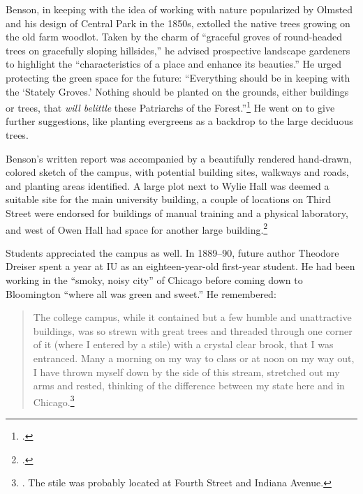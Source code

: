 \documentclass[
  american,
  letterpaper,
]{scrreprt}
\begin{document}
Benson, in keeping with the idea of working with nature popularized by
Olmsted and his design of Central Park in the 1850s, extolled the native
trees growing on the old farm woodlot. Taken by the charm of ``graceful
groves of round-headed trees on gracefully sloping hillsides,'' he
advised prospective landscape gardeners to highlight the
``characteristics of a place and enhance its beauties.'' He urged
protecting the green space for the future: ``Everything should be in
keeping with the `Stately Groves.' Nothing should be planted on the
grounds, either buildings or trees, that \emph{will belittle} these
Patriarchs of the Forest.''\footnote{.} He went on to give further suggestions, like
planting evergreens as a backdrop to the large deciduous trees.

Benson's written report was accompanied by a beautifully rendered
hand-drawn, colored sketch of the campus, with potential building sites,
walkways and roads, and planting areas identified. A large plot next to
Wylie Hall was deemed a suitable site for the main university building,
a couple of locations on Third Street were endorsed for buildings of
manual training and a physical laboratory, and west of Owen Hall had
space for another large building.\footnote{.}

Students appreciated the campus as well. In 1889--90, future author
Theodore Dreiser spent a year at IU as an eighteen-year-old first-year
student. He had been working in the ``smoky, noisy city'' of Chicago
before coming down to Bloomington ``where all was green and sweet.'' He
remembered:

\begin{quote}
The college campus, while it contained but a few humble and unattractive
buildings, was so strewn with great trees and threaded through one
corner of it (where I entered by a stile) with a crystal clear brook,
that I was entranced. Many a morning on my way to class or at noon on my
way out, I have thrown myself down by the side of this stream, stretched
out my arms and rested, thinking of the difference between my state here
and in Chicago.\footnote{. The stile was
  probably located at Fourth Street and Indiana Avenue.}
\end{quote}
\end{document}

